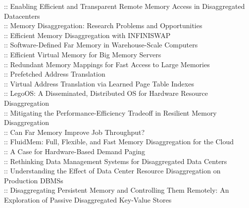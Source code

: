 \cite{transrm.web19} :: Enabling Efficient and Transparent Remote Memory Access in Disaggregated Datacenters \\
\cite{memdisaggrsch.icdcs19} :: Memory Disaggregation: Research Problems and Opportunities \\
\cite{infiniswap.nsdi17} :: Efficient Memory Disaggregation with INFINISWAP \\
\cite{softfarmem.asplos19} :: Software-Defined Far Memory in Warehouse-Scale Computers \\
\cite{vmembigserver.isca13} :: Efficient Virtual Memory for Big Memory Servers \\
\cite{rmemmap.isca15} :: Redundant Memory Mappings for Fast Access to Large Memories \\
\cite{prefetchats.micro19} :: Prefetched Address Translation \\
\cite{learnedpagetableindex.nips18} :: Virtual Address Translation via Learned Page Table Indexes \\
\cite{legoos.osdi18} :: LegoOS: A Disseminated, Distributed OS for Hardware Resource Disaggregation \\
\cite{ememdisagg.web19} :: Mitigating the Performance-Efficiency Tradeoff in Resilient Memory Disaggregation \\
\cite{fastswap.eurosys20} :: Can Far Memory Improve Job Throughput? \\
\cite{fluidmem.icdcs20} :: FluidMem: Full, Flexible, and Fast Memory Disaggregation for the Cloud \\
\cite{hwdemandpaging.isca20} :: A Case for Hardware-Based Demand Paging \\
\cite{dbmsdisagg1.cidr20} :: Rethinking Data Management Systems for Disaggregated Data Centers \\
\cite{dbmsdisagg2.vldb20} :: Understanding the Effect of Data Center Resource Disaggregation on Production DBMSs \\
\cite{kvdisagg.atc20} :: Disaggregating Persistent Memory and Controlling Them Remotely: An Exploration of Passive Disaggregated Key-Value Stores \\
